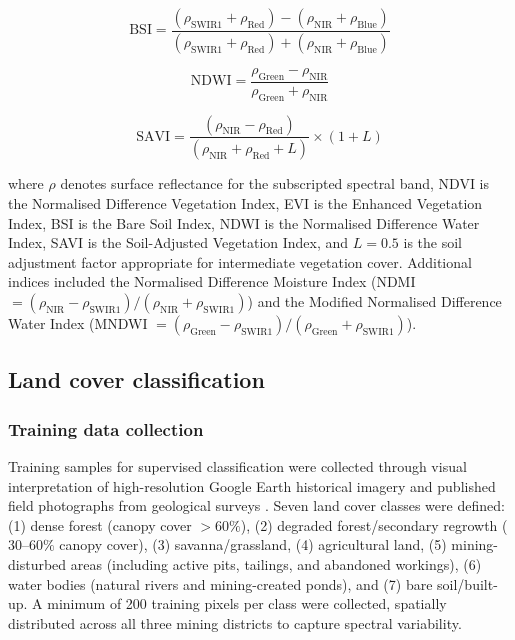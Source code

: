 \documentclass[preprint,12pt,authoryear]{elsarticle}
\begin{document}
\begin{equation}
\text{BSI} = \frac{(\rho_\text{SWIR1} + \rho_\text{Red}) - (\rho_\text{NIR} + \rho_\text{Blue})}{(\rho_\text{SWIR1} + \rho_\text{Red}) + (\rho_\text{NIR} + \rho_\text{Blue})}
\label{eq:bsi}
\end{equation}

\begin{equation}
\text{NDWI} = \frac{\rho_\text{Green} - \rho_\text{NIR}}{\rho_\text{Green} + \rho_\text{NIR}}
\label{eq:ndwi}
\end{equation}

\begin{equation}
\text{SAVI} = \frac{(\rho_\text{NIR} - \rho_\text{Red})}{(\rho_\text{NIR} + \rho_\text{Red} + L)} \times (1 + L)
\label{eq:savi}
\end{equation}

\noindent where $\rho$ denotes surface reflectance for the subscripted spectral band, NDVI is the Normalised Difference Vegetation Index, EVI is the Enhanced Vegetation Index, BSI is the Bare Soil Index, NDWI is the Normalised Difference Water Index, SAVI is the Soil-Adjusted Vegetation Index, and $L = 0.5$ is the soil adjustment factor appropriate for intermediate vegetation cover. Additional indices included the Normalised Difference Moisture Index (NDMI $= (\rho_\text{NIR} - \rho_\text{SWIR1}) / (\rho_\text{NIR} + \rho_\text{SWIR1})$) and the Modified Normalised Difference Water Index (MNDWI $= (\rho_\text{Green} - \rho_\text{SWIR1}) / (\rho_\text{Green} + \rho_\text{SWIR1})$).


\subsection{Land cover classification}

\subsubsection{Training data collection}

Training samples for supervised classification were collected through visual interpretation of high-resolution Google Earth historical imagery and published field photographs from geological surveys \citep{Kamga2020, Mimba2018}. Seven land cover classes were defined: (1) dense forest (canopy cover $> 60\%$), (2) degraded forest/secondary regrowth ($30$--$60\%$ canopy cover), (3) savanna/grassland, (4) agricultural land, (5) mining-disturbed areas (including active pits, tailings, and abandoned workings), (6) water bodies (natural rivers and mining-created ponds), and (7) bare soil/built-up. A minimum of 200 training pixels per class were collected, spatially distributed across all three mining districts to capture spectral variability.
\end{document}
